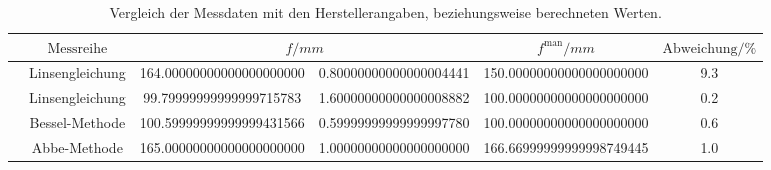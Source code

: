 \begin{table}
        \caption{Vergleich der Messdaten mit den Herstellerangaben, beziehungsweise berechneten Werten.}
        \centering
        \label{tab:disk}
        \begin{tabular}{l@{} c S[table-format=3.2, round-precision=4, round-mode=figures] @{${}\pm{}$} S[table-format=1.1, round-precision=1, round-mode=figures] S[table-format=2.2, round-precision=4, round-mode=figures] S[table-format=1.1, round-precision=2, round-mode=off] } \toprule & {$\text{Messreihe}$}& & {$f^\text{man}/\si{mm}$}& {$\text{Abweichung}/\si{\percent}$}\\\midrule& Linsengleichung & 164.00000000000000000000 & 0.80000000000000004441 & 150.00000000000000000000 & 9.3  \\
& Linsengleichung & 99.79999999999999715783 & 1.60000000000000008882 & 100.00000000000000000000 & 0.2  \\
& Bessel-Methode & 100.59999999999999431566 & 0.59999999999999997780 & 100.00000000000000000000 & 0.6  \\
& Abbe-Methode & 165.00000000000000000000 & 1.00000000000000000000 & 166.66999999999998749445 & 1.0  \\
 \bottomrule \end{tabular} \end{table}
